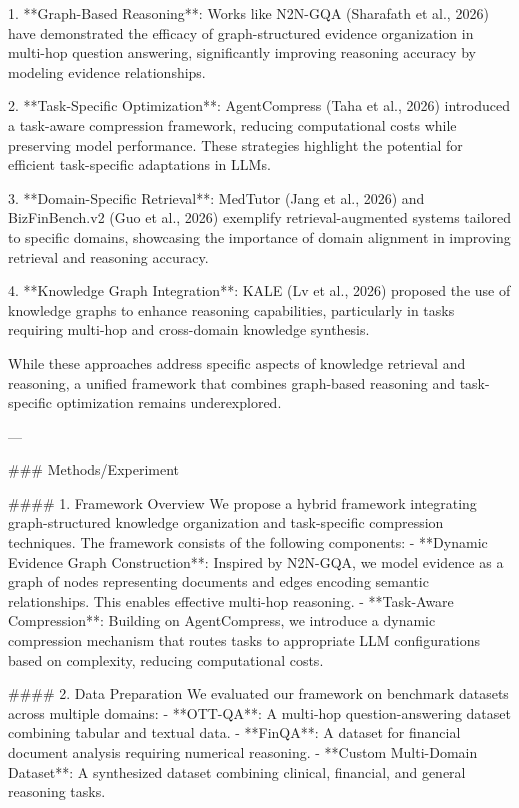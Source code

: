 1. **Graph-Based Reasoning**: Works like N2N-GQA (Sharafath et al., 2026) have demonstrated the efficacy of graph-structured evidence organization in multi-hop question answering, significantly improving reasoning accuracy by modeling evidence relationships.

2. **Task-Specific Optimization**: AgentCompress (Taha et al., 2026) introduced a task-aware compression framework, reducing computational costs while preserving model performance. These strategies highlight the potential for efficient task-specific adaptations in LLMs.

3. **Domain-Specific Retrieval**: MedTutor (Jang et al., 2026) and BizFinBench.v2 (Guo et al., 2026) exemplify retrieval-augmented systems tailored to specific domains, showcasing the importance of domain alignment in improving retrieval and reasoning accuracy.

4. **Knowledge Graph Integration**: KALE (Lv et al., 2026) proposed the use of knowledge graphs to enhance reasoning capabilities, particularly in tasks requiring multi-hop and cross-domain knowledge synthesis.

While these approaches address specific aspects of knowledge retrieval and reasoning, a unified framework that combines graph-based reasoning and task-specific optimization remains underexplored.

---

### Methods/Experiment

#### 1. Framework Overview
We propose a hybrid framework integrating graph-structured knowledge organization and task-specific compression techniques. The framework consists of the following components:
- **Dynamic Evidence Graph Construction**: Inspired by N2N-GQA, we model evidence as a graph of nodes representing documents and edges encoding semantic relationships. This enables effective multi-hop reasoning.
- **Task-Aware Compression**: Building on AgentCompress, we introduce a dynamic compression mechanism that routes tasks to appropriate LLM configurations based on complexity, reducing computational costs.

#### 2. Data Preparation
We evaluated our framework on benchmark datasets across multiple domains:
- **OTT-QA**: A multi-hop question-answering dataset combining tabular and textual data.
- **FinQA**: A dataset for financial document analysis requiring numerical reasoning.
- **Custom Multi-Domain Dataset**: A synthesized dataset combining clinical, financial, and general reasoning tasks.

